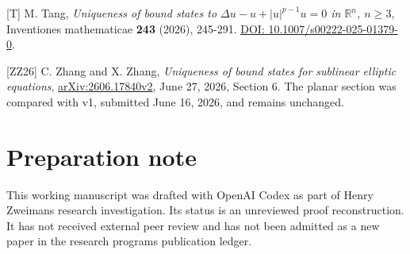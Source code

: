 \documentclass[11pt]{article}
\begin{document}
{[}T{]} M. Tang, \emph{Uniqueness of bound states to
\(\Delta u-u+|u|^{p-1}u=0\) in \(\mathbb R^n\), \(n\geq3\)}, Inventiones
mathematicae \textbf{243} (2026), 245-291.
\href{https://doi.org/10.1007/s00222-025-01379-0}{DOI:
10.1007/s00222-025-01379-0}.

{[}ZZ26{]} C. Zhang and X. Zhang, \emph{Uniqueness of bound states for
sublinear elliptic equations},
\href{https://arxiv.org/abs/2606.17840v2}{arXiv:2606.17840v2}, June 27,
2026, Section 6. The planar section was compared with v1, submitted June
16, 2026, and remains unchanged.

\section{Preparation note}\label{preparation-note}

This working manuscript was drafted with OpenAI Codex as part of Henry
Zweiman\textquotesingle s research investigation. Its status is an
unreviewed proof reconstruction. It has not received external peer
review and has not been admitted as a new paper in the research
program\textquotesingle s publication ledger.
\end{document}
